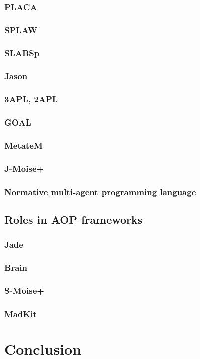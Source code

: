 \documentclass{article}
\begin{document}
\subsubsection{PLACA}
\subsubsection{SPLAW}
\subsubsection{SLABSp}
\subsubsection{Jason}
\subsubsection{3APL, 2APL}
\subsubsection{GOAL}
\subsubsection{MetateM}
\subsubsection{J-Moise+}
\subsubsection{Normative multi-agent programming language}

\subsection{Roles in AOP frameworks}

\subsubsection{Jade}
\subsubsection{Brain}
\subsubsection{S-Moise+}
\subsubsection{MadKit}

\section{Conclusion}



\end{document}
